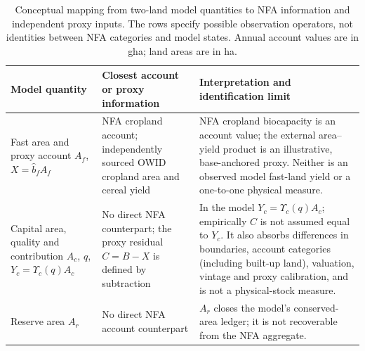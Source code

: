 \documentclass[11pt,a4paper]{article}
\newcommand{\Ups}{\Upsilon_c}
\begin{document}
\begin{table}[htbp]
\centering\small
\caption{Conceptual mapping from two-land model quantities to NFA information and independent proxy inputs. The rows specify possible observation operators, not identities between NFA categories and model states. Annual account values are in gha; land areas are in ha.}
\label{tab:si_model_nfa}
\begin{tabularx}{\textwidth}{>{\raggedright\arraybackslash}p{} >{\raggedright\arraybackslash}p{} X}
\toprule
Model quantity & Closest account or proxy information & Interpretation and identification limit \\
\midrule
Fast area and proxy account $A_f$, $X=\hat b_fA_f$ & NFA cropland account; independently sourced OWID cropland area and cereal yield & NFA cropland biocapacity is an account value; the external area--yield product is an illustrative, base-anchored proxy. Neither is an observed model fast-land yield or a one-to-one physical measure. \\
Capital area, quality and contribution $A_c$, $q$, $Y_c=\Ups(q)A_c$ & No direct NFA counterpart; the proxy residual $C=B-X$ is defined by subtraction & In the model $Y_c=\Ups(q)A_c$; empirically $C$ is not assumed equal to $Y_c$. It also absorbs differences in boundaries, account categories (including built-up land), valuation, vintage and proxy calibration, and is not a physical-stock measure. \\
Reserve area $A_r$ & No direct NFA account counterpart & $A_r$ closes the model's conserved-area ledger; it is not recoverable from the NFA aggregate. \\
\bottomrule
\end{tabularx}
\end{table}
\end{document}
